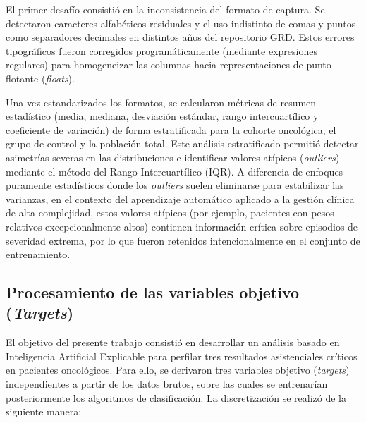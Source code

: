 El primer desafío consistió en la inconsistencia del formato de captura. Se detectaron caracteres alfabéticos residuales y el uso indistinto de comas y puntos como separadores decimales en distintos años del repositorio GRD. Estos errores tipográficos fueron corregidos programáticamente (mediante expresiones regulares) para homogeneizar las columnas hacia representaciones de punto flotante (\textit{floats}). 

Una vez estandarizados los formatos, se calcularon métricas de resumen estadístico (media, mediana, desviación estándar, rango intercuartílico y coeficiente de variación) de forma estratificada para la cohorte oncológica, el grupo de control y la población total. Este análisis estratificado permitió detectar asimetrías severas en las distribuciones e identificar valores atípicos (\textit{outliers}) mediante el método del Rango Intercuartílico (IQR). A diferencia de enfoques puramente estadísticos donde los \textit{outliers} suelen eliminarse para estabilizar las varianzas, en el contexto del aprendizaje automático aplicado a la gestión clínica de alta complejidad, estos valores atípicos (por ejemplo, pacientes con pesos relativos excepcionalmente altos) contienen información crítica sobre episodios de severidad extrema, por lo que fueron retenidos intencionalmente en el conjunto de entrenamiento.

\subsection{Procesamiento de las variables objetivo (\textit{Targets})}
El objetivo del presente trabajo consistió en desarrollar un análisis basado en Inteligencia Artificial Explicable para perfilar tres resultados asistenciales críticos en pacientes oncológicos. Para ello, se derivaron tres variables objetivo (\textit{targets}) independientes a partir de los datos brutos, sobre las cuales se entrenarían posteriormente los algoritmos de clasificación. La discretización se realizó de la siguiente manera:

